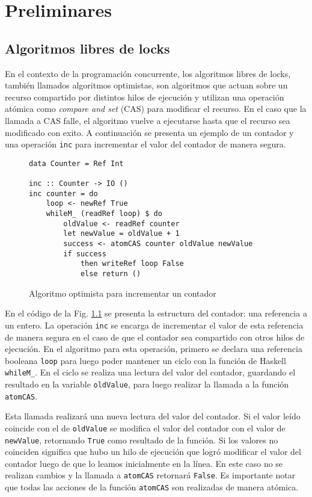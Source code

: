 \chapter{Preliminares}


\section{Algoritmos libres de locks}
En el contexto de la programación concurrente, los algoritmos libres de locks, también llamados algoritmos optimistas, son algoritmos que actuan sobre un recurso compartido por distintos hilos de ejecución y utilizan una operación atómica como \emph{compare and set} (CAS) para modificar el recurso.
En el caso que la llamada a CAS falle, el algoritmo vuelve a ejecutarse hasta que el recurso sea modificado con exito.
A continuación se presenta un ejemplo de un contador y una operación \texttt{inc} para incrementar el valor del contador de manera segura.

\begin{figure}[H]
\begin{verbatim}
data Counter = Ref Int

inc :: Counter -> IO ()
inc counter = do
    loop <- newRef True
    whileM_ (readRef loop) $ do
        oldValue <- readRef counter
        let newValue = oldValue + 1
        success <- atomCAS counter oldValue newValue
        if success
            then writeRef loop False
            else return ()
\end{verbatim}
\caption{Algoritmo optimista para incrementar un contador}
\label{fig:lockfree-counter-example}
\end{figure}

En el código de la Fig. \ref{fig:lockfree-counter-example} se presenta la estructura del contador: una referencia a un entero.
La operación \texttt{inc} se encarga de incrementar el valor de esta referencia de manera segura en el caso de que el contador sea compartido con otros hilos de ejecución.
En el algoritmo para esta operación, primero se declara una referencia booleana \texttt{loop} para luego poder mantener un ciclo con la función de Haskell \texttt{whileM_}.
En el ciclo se realiza una lectura del valor del contador, guardando el resultado en la variable \texttt{oldValue}, para luego realizar la llamada a la función \texttt{atomCAS}.

Esta llamada realizará una nueva lectura del valor del contador.
Si el valor leído coincide con el de \texttt{oldValue} se modifica el valor del contador con el valor de \texttt{newValue}, retornando \texttt{True} como resultado de la función.
Si los valores no coinciden significa que hubo un hilo de ejecución que logró modificar el valor del contador luego de que lo leamos inicialmente en la línea.
En este caso no se realizan cambios y la llamada a \texttt{atomCAS} retornará \texttt{False}.
Es importante notar que todas las acciones de la función \texttt{atomCAS} son realizadas de manera atómica.

